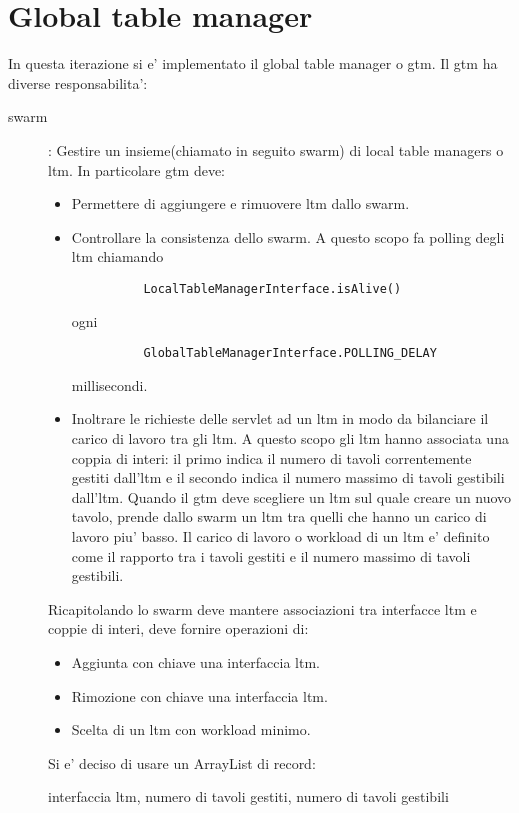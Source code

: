 \section{Global table manager}
    In questa iterazione si e' implementato il global table manager o gtm. Il gtm ha diverse responsabilita': 
    \begin{description}
      \item[swarm]: 
	Gestire un insieme(chiamato in seguito swarm) di local table managers o ltm. In particolare gtm deve:
	\begin{itemize}
	  \item 
	    Permettere di aggiungere e rimuovere ltm dallo swarm.
	  \item
	    Controllare la consistenza dello swarm. A questo scopo fa polling degli ltm chiamando 	
	    \begin{verbatim} 
	      LocalTableManagerInterface.isAlive()
	    \end{verbatim}
	    ogni 
	    \begin{verbatim} 
	      GlobalTableManagerInterface.POLLING_DELAY
	    \end{verbatim} 
	    millisecondi.   
	  \item
	    Inoltrare le richieste delle servlet ad un ltm in modo da bilanciare il carico di lavoro tra gli ltm. A questo scopo gli ltm hanno associata una coppia di interi: il primo indica il numero di tavoli correntemente gestiti dall'ltm e il secondo indica il numero massimo di tavoli gestibili dall'ltm. Quando il gtm deve scegliere un ltm sul quale creare un nuovo tavolo, prende dallo swarm un ltm tra quelli che hanno un carico di lavoro piu' basso. Il carico di lavoro o workload di un ltm e' definito come il rapporto tra i tavoli gestiti e il numero massimo di tavoli gestibili.
	\end{itemize}
	Ricapitolando lo swarm deve mantere associazioni tra interfacce ltm e coppie di interi, deve fornire operazioni di:
	\begin{itemize}
	   \item 	
	      Aggiunta con chiave una interfaccia ltm.
	   \item 
	      Rimozione con chiave una interfaccia ltm.
	   \item 	
	      Scelta di un ltm con workload minimo.
	\end{itemize}
	Si e' deciso di usare un ArrayList di record:
	\begin{center}
	  interfaccia ltm, numero di tavoli gestiti, numero di tavoli gestibili

\end{center}
\end{description}
